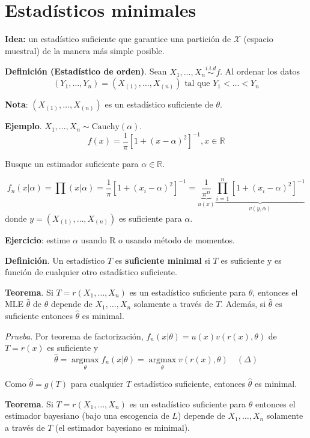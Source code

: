 \documentclass[
  12pt,
]{book}
\begin{document}
\hypertarget{estaduxedsticos-minimales}{%
\section{Estadísticos minimales}\label{estaduxedsticos-minimales}}

\textbf{Idea:} un estadístico suficiente que garantice una partición de \(\mathcal X\) (espacio muestral) de la manera más simple posible.

\textbf{Definición (Estadístico de orden)}. Sean \(X_1,\dots, X_n \stackrel{i.i.d}{\sim} f\). Al ordenar los datos
\[(Y_1,\dots,Y_n) = (X_{(1)},\dots,X_{(n)}) \text { tal que } Y_1<\dots<Y_n\]

\textbf{Nota}: \((X_{(1)},\dots,X_{(n)})\) es un estadístico suficiente de \(\theta\).

\textbf{Ejemplo}. \(X_1,\dots, X_n \sim \text{Cauchy}(\alpha)\).
\[ f(x) = \dfrac1\pi[1+(x-\alpha)^2]^{-1}, x\in\mathbb R\]

Busque un estimador suficiente para \(\alpha \in \mathbb R\).

\[ f_n(x|\alpha) = \prod(x|\alpha) = \dfrac 1\pi [1+(x_i-\alpha)^2]^{-1} = \underbrace{\dfrac 1{\pi^n}}_{u(x)}\underbrace{\prod_{i=1}^n[1+(x_i-\alpha)^2]^{-1} }_{v(y,\alpha)} \]
donde \(y = (X_{(1)},\dots,X_{(n)})\) es suficiente para \(\alpha\).

\textbf{Ejercicio}: estime \(\alpha\) usando R o usando método de momentos.

\textbf{Definición}. Un estadístico \(T\) es \textbf{suficiente minimal} si \(T\) es suficiente y es función de cualquier otro estadístico suficiente.

\textbf{Teorema}. Si \(T = r(X_1,\dots, X_n)\) es un estadístico suficiente para \(\theta\), entonces el MLE \(\hat\theta\) de \(\theta\) depende de \(X_1,\dots, X_n\) solamente a través de \(T\). Además, si \(\hat \theta\) es suficiente entonces \(\hat \theta\) es minimal.

\emph{Prueba}. Por teorema de factorización, \(f_n(x|\theta) = u(x)v(r(x),\theta)\) de \(T = r(x)\) es suficiente y
\[\hat\theta = \operatorname*{argmax}_\theta f_n(x|\theta) = \operatorname*{argmax}_\theta v(r(x),\theta) \quad(\Delta)\]

Como \(\hat\theta = g(T)\) para cualquier \(T\) estadístico suficiente, entonces \(\hat\theta\) es minimal.

\textbf{Teorema}. Si \(T = r(X_1,\dots, X_n)\) es un estadístico suficiente para \(\theta\) entonces el estimador bayesiano (bajo una escogencia de \(L\)) depende de \(X_1,\dots, X_n\) solamente a través de \(T\) (el estimador bayesiano es minimal).
\end{document}
